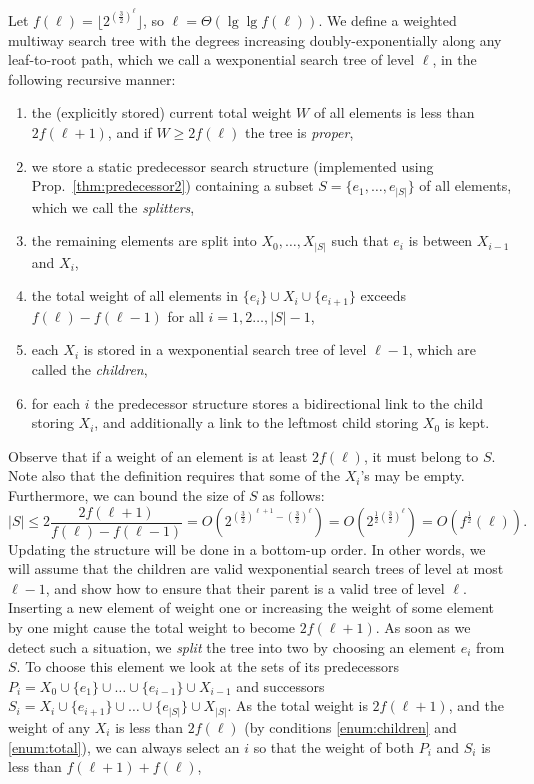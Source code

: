 \documentclass[11pt,onecolumn,final]{article} \usepackage{a4}
\theoremstyle{plain}
\theoremstyle{remark}
\begin{document}
Let $f(\ell)=\lfloor 2^{(\frac{3}{2})^{\ell}}\rfloor$, so $\ell=\Theta(\lg\lg f(\ell))$. We define a weighted multiway search tree with the degrees increasing doubly-exponentially along any leaf-to-root path, which we call a wexponential search tree of level $\ell$, in the following recursive manner:
\begin{enumerate}
\item the (explicitly stored) current total weight $W$ of all elements is less than $2f(\ell+1)$, and if $W\geq 2f(\ell)$ the tree is \emph{proper},\label{enum:total}
\item we store a static predecessor search structure (implemented using Prop.~\ref{thm:predecessor2}) containing a subset $S=\{e_{1},\ldots,e_{|S|}\}$ of all elements, which we call the \emph{splitters},
\item the remaining elements are split into $X_{0},\ldots,X_{|S|}$ such that $e_{i}$ is between $X_{i-1}$ and $X_{i}$,
\item the total weight of all elements in $\{e_{i}\}\cup X_{i}\cup\{e_{i+1}\}$ exceeds  $f(\ell)-f(\ell-1)$ for all $i=1,2\ldots,|S|-1$,
\item each $X_{i}$ is stored in a wexponential search tree of level $\ell-1$, which are called the \emph{children},\label{enum:children}
\item for each $i$ the predecessor structure stores a bidirectional link to the child storing $X_{i}$, and additionally a link to the leftmost child storing $X_{0}$ is kept.
\end{enumerate}
Observe that if a weight of an element is at least $2f(\ell)$,
it must belong to $S$. Note also that the definition requires that some of the $X_i$'s may be empty.
Furthermore, we can bound the size of $S$ as follows:
\begin{equation}\label{eqn:splitters}
|S| \leq 2\frac{2f(\ell+1)}{f(\ell)-f(\ell-1)} = O(2^{(\frac{3}{2})^{\ell+1}-(\frac{3}{2})^{\ell}})=O(2^{\frac{1}{2}(\frac{3}{2})^{\ell}})=O(f^{\frac{1}{2}}(\ell)) .
\end{equation}
Updating the structure will be done in a bottom-up order. In other words, we will assume that the children are valid wexponential search trees of level at most $\ell-1$, and show how to ensure that their parent is a valid tree  of level $\ell$.  Inserting a new element of weight one or increasing the weight of some element by one might cause the total weight to become $2f(\ell+1)$. As soon as we detect such a situation, we \emph{split} the tree into two by choosing an element $e_{i}$ from $S$. To choose this element we look at the sets of its predecessors $P_{i}=X_{0}\cup\{e_{1}\}\cup\ldots\cup\{e_{i-1}\}\cup X_{i-1}$ and successors $S_{i}=X_{i}\cup\{e_{i+1}\}\cup\ldots\cup\{e_{|S|}\}\cup X_{|S|}$. As the total weight is $2f(\ell+1)$, and the weight of any $X_{i}$ is less than $2f(\ell)$ (by conditions \ref{enum:children} and \ref{enum:total}), we can always select an $i$ so that the weight of both $P_{i}$ and $S_{i}$ is less than $f(\ell+1)+f(\ell)$,
\end{document}
